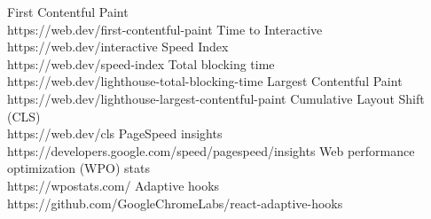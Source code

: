 \newpage
\begin{thebibliography}{10}
    \bibitem{} First Contentful Paint \\
     https://web.dev/first-contentful-paint
    \bibitem{} Time to Interactive \\
     https://web.dev/interactive
    \bibitem{} Speed Index \\
    https://web.dev/speed-index
    \bibitem{} Total blocking time \\
    https://web.dev/lighthouse-total-blocking-time
    \bibitem{} Largest Contentful Paint \\
    https://web.dev/lighthouse-largest-contentful-paint
    \bibitem{} Cumulative Layout Shift (CLS) \\
    https://web.dev/cls
    \bibitem{} PageSpeed insights \\
    https://developers.google.com/speed/pagespeed/insights
    \bibitem{} Web performance optimization (WPO) stats
    \\ https://wpostats.com/
    \bibitem{} Adaptive hooks \\
    https://github.com/GoogleChromeLabs/react-adaptive-hooks
\end{thebibliography}
